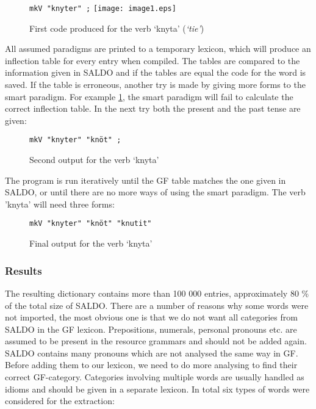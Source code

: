 \documentclass[10pt, a4paper]{article}
\begin{document}
\begin{figure}[h]
\begin{center}
\verb-mkV "knyter" ;-
\texttt{[image: image1.eps]} 
\caption{First code produced for the verb `knyta' (\emph{`tie'})}
\label{fig:saldoknyt}
\end{center}
\end{figure}

All assumed paradigms are printed to a temporary lexicon, 
which will produce an inflection table for every entry when compiled.
The tables are compared to the information given
in SALDO and if the tables are equal the code for the word is saved. If the table
is erroneous, another try is made
by giving more forms to the smart paradigm.
For example \ref{fig:saldoknyt}, the smart paradigm will fail to calculate the
correct inflection table. In the next try both the present and the past tense
are given:\\

\begin{figure}[h]
\begin{center}
\verb-mkV "knyter" "knöt" ;-
\caption{Second output for the verb `knyta'}
\label{fig:saldoknyt2}
\end{center}
\end{figure}

The program is run iteratively until the GF table matches the one given in SALDO,
or until there are no more ways of using the smart paradigm. The verb 'knyta'
will need three forms:\\

\begin{figure}[h]
\begin{center}
\verb-mkV "knyter" "knöt" "knutit"-\\
\caption{Final output for the verb `knyta'}
\label{fig:saldoknyt3}
\end{center}
\end{figure}


\subsubsection{Results}
\label{sec:saldoRes}
The resulting dictionary contains more than 100 000 entries, approximately 80 \% 
of the total size of SALDO.
There are a number of reasons why some words were not imported,
the most obvious one is that we do not want all categories from
SALDO in the GF lexicon. Prepositions, 
numerals, 
personal pronouns etc.
are assumed to be present in the resource grammars and should not be added again.
SALDO contains many pronouns which
are not analysed the same way in GF. %
Before adding them to our lexicon, we need to do more analysing to find their
correct GF-category. 
Categories involving multiple words 
are usually handled as idioms and should be given in a separate lexicon. In
total six types of words were considered for the extraction: \\
\end{document}
